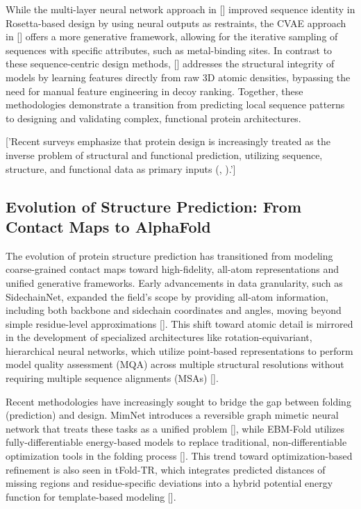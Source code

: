 \documentclass[11pt]{article}
\begin{document}
While the multi-layer neural network approach in [\citep{1801.07130}] improved sequence identity in Rosetta-based design by using neural outputs as restraints, the CVAE approach in [\citep{1806.09900}] offers a more generative framework, allowing for the iterative sampling of sequences with specific attributes, such as metal-binding sites. In contrast to these sequence-centric design methods, [\citep{1801.06252}] addresses the structural integrity of models by learning features directly from raw 3D atomic densities, bypassing the need for manual feature engineering in decoy ranking. Together, these methodologies demonstrate a transition from predicting local sequence patterns to designing and validating complex, functional protein architectures.

['Recent surveys emphasize that protein design is increasingly treated as the inverse problem of structural and functional prediction, utilizing sequence, structure, and functional data as primary inputs (\citep{2501.01477}, \citep{2502.19173}).']
\subsection{Evolution of Structure Prediction: From Contact Maps to AlphaFold}

The evolution of protein structure prediction has transitioned from modeling coarse-grained contact maps toward high-fidelity, all-atom representations and unified generative frameworks. Early advancements in data granularity, such as SidechainNet, expanded the field's scope by providing all-atom information, including both backbone and sidechain coordinates and angles, moving beyond simple residue-level approximations [\citep{2010.08162}]. This shift toward atomic detail is mirrored in the development of specialized architectures like rotation-equivariant, hierarchical neural networks, which utilize point-based representations to perform model quality assessment (MQA) across multiple structural resolutions without requiring multiple sequence alignments (MSAs) [\citep{2011.13557}].

Recent methodologies have increasingly sought to bridge the gap between folding (prediction) and design. MimNet introduces a reversible graph mimetic neural network that treats these tasks as a unified problem [\citep{2102.03881}], while EBM-Fold utilizes fully-differentiable energy-based models to replace traditional, non-differentiable optimization tools in the folding process [\citep{2105.04771}]. This trend toward optimization-based refinement is also seen in tFold-TR, which integrates predicted distances of missing regions and residue-specific deviations into a hybrid potential energy function for template-based modeling [\citep{2105.04350}].
\end{document}

